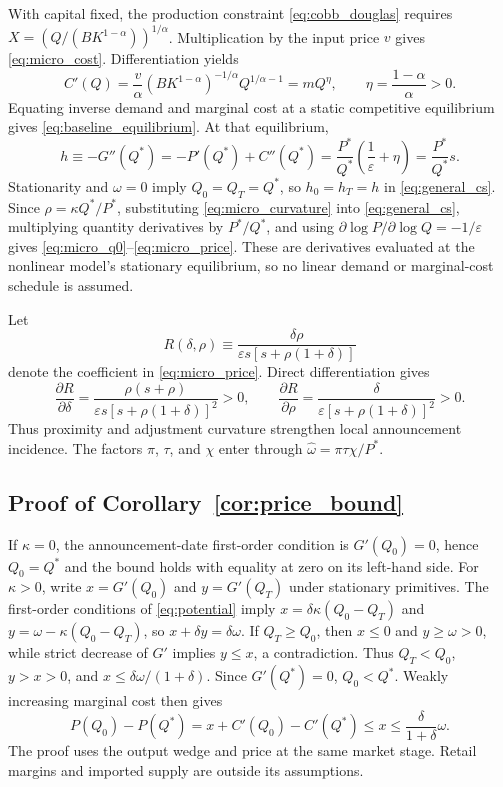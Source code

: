 \documentclass[11pt]{article}
\begin{document}
With capital fixed, the production constraint \eqref{eq:cobb_douglas} requires $X=(Q/(BK^{1-\alpha}))^{1/\alpha}$. Multiplication by the input price $v$ gives \eqref{eq:micro_cost}. Differentiation yields
\begin{equation*}
C'(Q)=\frac{v}{\alpha}(BK^{1-\alpha})^{-1/\alpha}Q^{1/\alpha-1}
=mQ^{\eta},
\qquad \eta=\frac{1-\alpha}{\alpha}>0.
\end{equation*}
Equating inverse demand and marginal cost at a static competitive equilibrium gives \eqref{eq:baseline_equilibrium}. At that equilibrium,
\begin{equation}\label{eq:micro_curvature}
h\equiv-G''(Q^*)=-P'(Q^*)+C''(Q^*)
=\frac{P^*}{Q^*}\left(\frac{1}{\varepsilon}+\eta\right)
=\frac{P^*}{Q^*}s.
\end{equation}
Stationarity and $\omega=0$ imply $Q_0=Q_T=Q^*$, so $h_0=h_T=h$ in \eqref{eq:general_cs}. Since $\rho=\kappa Q^*/P^*$, substituting \eqref{eq:micro_curvature} into \eqref{eq:general_cs}, multiplying quantity derivatives by $P^*/Q^*$, and using $\partial\log P/\partial\log Q=-1/\varepsilon$ gives \eqref{eq:micro_q0}--\eqref{eq:micro_price}. These are derivatives evaluated at the nonlinear model's stationary equilibrium, so no linear demand or marginal-cost schedule is assumed.

Let
\begin{equation*}
R(\delta,\rho)\equiv
\frac{\delta\rho}{\varepsilon s[s+\rho(1+\delta)]}
\end{equation*}
denote the coefficient in \eqref{eq:micro_price}. Direct differentiation gives
\begin{equation*}
\frac{\partial R}{\partial\delta}
=\frac{\rho(s+\rho)}{\varepsilon s[s+\rho(1+\delta)]^2}>0,
\qquad
\frac{\partial R}{\partial\rho}
=\frac{\delta}{\varepsilon[s+\rho(1+\delta)]^2}>0.
\end{equation*}
Thus proximity and adjustment curvature strengthen local announcement incidence. The factors $\pi$, $\tau$, and $\chi$ enter through $\widehat{\omega}=\pi\tau\chi/P^*$.

\subsection{Proof of Corollary~\ref{cor:price_bound}}
If $\kappa=0$, the announcement-date first-order condition is $G'(Q_0)=0$, hence $Q_0=Q^*$ and the bound holds with equality at zero on its left-hand side. For $\kappa>0$, write $x=G'(Q_0)$ and $y=G'(Q_T)$ under stationary primitives. The first-order conditions of \eqref{eq:potential} imply $x=\delta\kappa(Q_0-Q_T)$ and $y=\omega-\kappa(Q_0-Q_T)$, so $x+\delta y=\delta\omega$. If $Q_T\geq Q_0$, then $x\leq0$ and $y\geq\omega>0$, while strict decrease of $G'$ implies $y\leq x$, a contradiction. Thus $Q_T<Q_0$, $y>x>0$, and $x\leq\delta\omega/(1+\delta)$. Since $G'(Q^*)=0$, $Q_0<Q^*$. Weakly increasing marginal cost then gives
\begin{equation*}
P(Q_0)-P(Q^*)=x+C'(Q_0)-C'(Q^*)\leq x\leq\frac{\delta}{1+\delta}\omega.
\end{equation*}
The proof uses the output wedge and price at the same market stage. Retail margins and imported supply are outside its assumptions.
\end{document}
